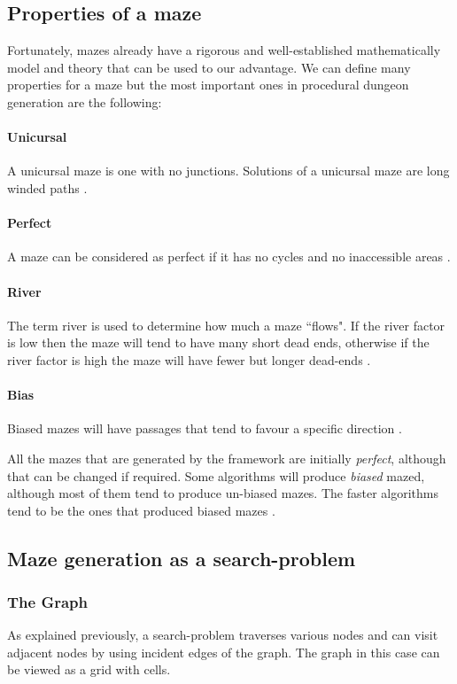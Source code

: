 \subsection{Properties of a maze}
Fortunately, mazes already have a rigorous and well-established mathematically model and theory that can be used to our advantage. We can define many properties for a maze but the most important ones in procedural dungeon generation are the following:
\paragraph{Unicursal} A unicursal maze is one with no junctions. Solutions of a unicursal maze are long winded paths \citep{ThinkLabyrinth}. 
\paragraph{Perfect} A maze can be considered as perfect if it has no cycles and no inaccessible areas \citep{ThinkLabyrinth}.
\paragraph{River} The term river is used to determine how much a maze ``flows". If the river factor is low then the maze will tend to have many short dead ends, otherwise if the river factor is high the maze will have fewer but longer dead-ends \citep{ThinkLabyrinth}.
\paragraph{Bias} Biased mazes will have passages that tend to favour a specific direction \citep{ThinkLabyrinth}. 

All the mazes that are generated by the framework are initially {\em perfect}, although that can be changed if required. Some algorithms will produce {\em biased} mazed, although most of them tend to produce un-biased mazes. The faster algorithms tend to be the ones that produced biased mazes \citep{ThinkLabyrinth}.

\subsection{Maze generation as a search-problem}
\subsubsection{The Graph}
As explained previously, a search-problem traverses various nodes and can visit adjacent nodes by using incident edges of the graph. The graph in this case can be viewed as a grid with cells.

